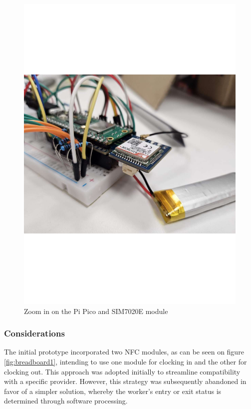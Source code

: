 \begin{figure}[h]
\begin{minipage}[b]{0.45\textwidth}
        \includegraphics[width=1\textwidth]{Imagenes/Vectorial/breadboard2.pdf}
        \caption{Zoom in on the Pi Pico and SIM7020E module}
        \label{fig:breadboard2}
    \end{minipage}
\end{figure}

\subsubsection*{Considerations}

The initial prototype incorporated two NFC modules, as can be seen on figure \ref{fig:breadboard1}, intending to use one 
module for clocking in and the other for clocking out. This approach was adopted initially to streamline compatibility 
with a specific provider. However, this strategy was subsequently abandoned in favor of a simpler solution, whereby the 
worker's entry or exit status is determined through software processing.

